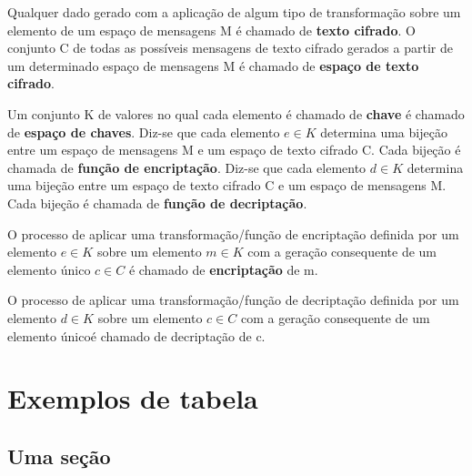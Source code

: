 \documentclass[
	10pt,				%
	openright,			%
	twoside,			%
	a5paper,			%
	english,			%
	french,				%
	spanish,			%
	brazil,				%
	sumario=tradicional
]{abntex2}
\begin{document}
Qualquer dado gerado com a aplicação de algum tipo de transformação sobre um elemento de um espaço de mensagens M é chamado de \textbf{texto cifrado}. O conjunto C de todas as possíveis mensagens de texto cifrado gerados a partir de um determinado espaço de mensagens M é chamado de \textbf{espaço de texto cifrado}.

Um conjunto K de valores no qual cada elemento é chamado de \textbf{chave} é chamado de \textbf{espaço de chaves}. Diz-se que cada elemento $e \in K$ determina uma bijeção entre um espaço de mensagens M e um espaço de texto cifrado C. Cada bijeção é chamada de \textbf{função de encriptação}. Diz-se que cada elemento $d \in K$ determina uma bijeção entre um espaço de texto cifrado C e um espaço de mensagens M. Cada bijeção é chamada de \textbf{função de decriptação}.

O processo de aplicar uma transformação/função de encriptação definida por um elemento $e \in K$ sobre um elemento $m \in K$ com a geração consequente de um elemento único $c \in C$ é chamado de \textbf{encriptação} de m.

O processo de aplicar uma transformação/função de decriptação definida por um elemento $d \in K$ sobre um elemento $c \in C$ com a geração consequente de um elemento únicoé chamado de decriptação de c.

\chapter{Exemplos de tabela}

\section{Uma seção}

\lipsum[8]
\end{document}
